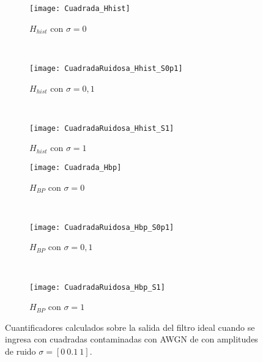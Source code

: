 \begin{figure}[h]
    \centering
    \begin{subfigure}[t]{0.32\textwidth}
        \texttt{[image: Cuadrada\_Hhist]}
        \caption{$H_{hist}$ con $\sigma=0$}
        \label{subfig:HhistCuadradaRuidosa_Sigma_0}
    \end{subfigure}
    ~ %
    \begin{subfigure}[t]{0.32\textwidth}
        \texttt{[image: CuadradaRuidosa\_Hhist\_S0p1]}
        \caption{$H_{hist}$ con $\sigma=0,1$}
        \label{subfig:HhistCuadradaRuidosa_Sigma_0p1}
    \end{subfigure}
    ~ %
    \begin{subfigure}[t]{0.32\textwidth}
        \texttt{[image: CuadradaRuidosa\_Hhist\_S1]}
        \caption{$H_{hist}$ con $\sigma=1$}
        \label{subfig:HhistCuadradaRuidosa_Sigma_1}
    \end{subfigure}
    \begin{subfigure}[t]{0.32\textwidth}
        \texttt{[image: Cuadrada\_Hbp]}
        \caption{$H_{BP}$ con $\sigma=0$}
        \label{subfig:HbpCuadradaRuidosa_Sigma_0}
    \end{subfigure}
    ~ %
    \begin{subfigure}[t]{0.32\textwidth}
        \texttt{[image: CuadradaRuidosa\_Hbp\_S0p1]}
        \caption{$H_{BP}$ con $\sigma=0,1$}
        \label{subfig:HbpCuadradaRuidosa_Sigma_0p1}
    \end{subfigure}
    ~ %
    \begin{subfigure}[t]{0.32\textwidth}
        \texttt{[image: CuadradaRuidosa\_Hbp\_S1]}
        \caption{$H_{BP}$ con $\sigma=1$}
        \label{subfig:HbpCuadradaRuidosa_Sigma_1}
    \end{subfigure}
    \caption{Cuantificadores calculados sobre la salida del filtro ideal cuando se ingresa con cuadradas contaminadas con AWGN de con amplitudes de ruido $\sigma=[0~0.1~1]$.}\label{fig:HCuadradaRuidosa_Sigma}
\end{figure}

